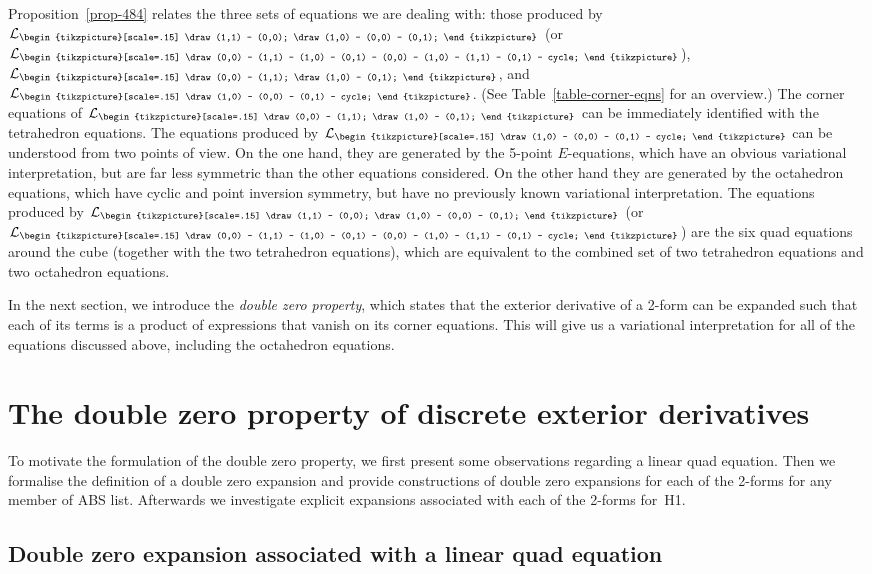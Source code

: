 \documentclass[pdftex]{sigma}
\newcommand{\crosssquare}{{\begin{tikzpicture}[scale=.15]
			\draw (0,0) -- (1,1) -- (1,0) -- (0,1) -- (0,0) -- (1,0) -- (1,1) -- (0,1) -- cycle;
\end{tikzpicture}}}
\newcommand{\cross}{{\begin{tikzpicture}[scale=.15]
			\draw (0,0) -- (1,1);
			\draw (1,0) -- (0,1);
\end{tikzpicture}}}
\newcommand{\triang}{{\begin{tikzpicture}[scale=.15]
			\draw (1,0) -- (0,0) -- (0,1) -- cycle;
\end{tikzpicture}}}
\newcommand{\trileg}{{\begin{tikzpicture}[scale=.15]
			\draw (1,1) -- (0,0);
			\draw (1,0) -- (0,0) -- (0,1);
\end{tikzpicture}}}
\newcommand{\cL}{\mathcal{L}}
\numberwithin{equation}{section}
\begin{document}
Proposition~\ref{prop-484} relates the three sets of equations we are dealing with: those produced by~$\cL_\trileg$ (or $\cL_\crosssquare$), $\cL_\cross$, and $\cL_\triang$. (See Table~\ref{table-corner-eqns} for an overview.)
The corner equations of $\cL_\cross$ can be immediately identified with the tetrahedron equations.
The equations produced by $\cL_\triang$ can be understood from two points of view. On the one hand, they are generated by the 5-point $E$-equations, which have an obvious variational interpretation, but are far less symmetric than the other equations considered. On the other hand they are generated by the octahedron equations, which have cyclic and point inversion symmetry, but have no previously known variational interpretation.
The equations produced by $\cL_\trileg$ (or $\cL_\crosssquare$) are the six quad equations around the cube (together with the two tetrahedron equations), which are equivalent to the combined set of two tetrahedron equations and two octahedron equations.

In the next section, we introduce the \emph{double zero property}, which states that the exterior derivative of a 2-form can be expanded such that each of its terms is a product of expressions that vanish on its corner equations. This will give us a variational interpretation for all of the equations discussed above, including the octahedron equations.


\section{The double zero property of discrete exterior derivatives}
\label{sec-double0}

To motivate the formulation of the double zero property, we first present some observations regarding a linear quad equation. Then we formalise the definition of a double zero expansion and provide constructions of double zero expansions for each of the 2-forms for any member of ABS list. Afterwards we investigate explicit expansions associated with each of the 2-forms for~H1.

\subsection{Double zero expansion associated with a linear quad equation}
\end{document}
